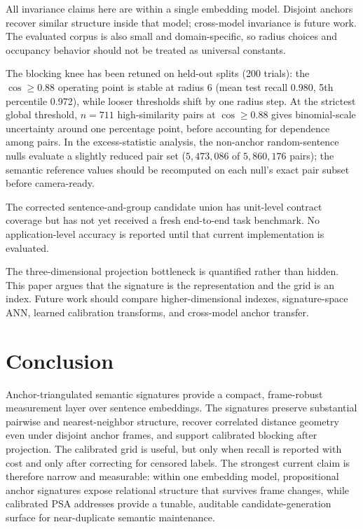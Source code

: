 \documentclass[11pt]{article}
\begin{document}
All invariance claims here are within a single embedding model. Disjoint anchors recover similar structure inside that model; cross-model invariance is future work. The evaluated corpus is also small and domain-specific, so radius choices and occupancy behavior should not be treated as universal constants.

The blocking knee has been retuned on held-out splits (200 trials): the $\cos\geq0.88$ operating point is stable at radius 6 (mean test recall 0.980, 5th percentile 0.972), while looser thresholds shift by one radius step. At the strictest global threshold, $n=711$ high-similarity pairs at $\cos\geq0.88$ gives binomial-scale uncertainty around one percentage point, before accounting for dependence among pairs. In the excess-statistic analysis, the non-anchor random-sentence nulls evaluate a slightly reduced pair set ($5{,}473{,}086$ of $5{,}860{,}176$ pairs); the semantic reference values should be recomputed on each null's exact pair subset before camera-ready.

The corrected sentence-and-group candidate union has unit-level contract coverage but has not yet received a fresh end-to-end task benchmark. No application-level accuracy is reported until that current implementation is evaluated.

The three-dimensional projection bottleneck is quantified rather than hidden. This paper argues that the signature is the representation and the grid is an index. Future work should compare higher-dimensional indexes, signature-space ANN, learned calibration transforms, and cross-model anchor transfer.

\section{Conclusion}

Anchor-triangulated semantic signatures provide a compact, frame-robust measurement layer over sentence embeddings. The signatures preserve substantial pairwise and nearest-neighbor structure, recover correlated distance geometry even under disjoint anchor frames, and support calibrated blocking after projection. The calibrated grid is useful, but only when recall is reported with cost and only after correcting for censored labels. The strongest current claim is therefore narrow and measurable: within one embedding model, propositional anchor signatures expose relational structure that survives frame changes, while calibrated PSA addresses provide a tunable, auditable candidate-generation surface for near-duplicate semantic maintenance.
\end{document}
